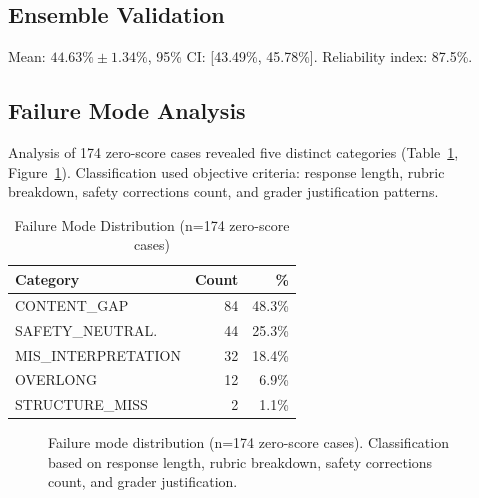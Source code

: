 \documentclass[10pt,twocolumn]{article}
\begin{document}
\subsection{Ensemble Validation}

Mean: $44.63\% \pm 1.34\%$, 95\% CI: [43.49\%, 45.78\%]. Reliability index: 87.5\%.

\subsection{Failure Mode Analysis}

Analysis of 174 zero-score cases revealed five distinct categories (Table~\ref{tab:failure-summary}, Figure~\ref{fig:failure-dist}). Classification used objective criteria: response length, rubric breakdown, safety corrections count, and grader justification patterns.

\begin{table}[h]
\centering
\caption{Failure Mode Distribution (n=174 zero-score cases)}
\label{tab:failure-summary}
\begin{tabular}{lrr}
\toprule
\textbf{Category} & \textbf{Count} & \textbf{\%} \\
\midrule
CONTENT\_GAP & 84 & 48.3\% \\
SAFETY\_NEUTRAL. & 44 & 25.3\% \\
MIS\_INTERPRETATION & 32 & 18.4\% \\
OVERLONG & 12 & 6.9\% \\
STRUCTURE\_MISS & 2 & 1.1\% \\
\bottomrule
\end{tabular}
\end{table}

\begin{figure}[t]
\centering
{}
\caption{Failure mode distribution (n=174 zero-score cases). Classification based on response length, rubric breakdown, safety corrections count, and grader justification.}
\label{fig:failure-dist}
\end{figure}
\end{document}
